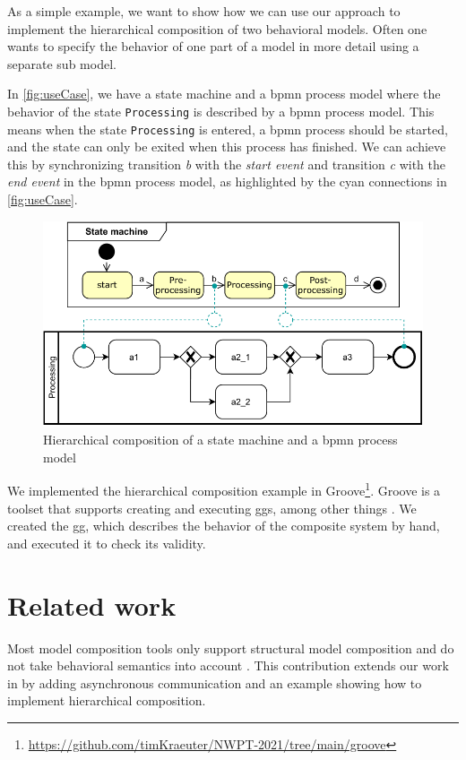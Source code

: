 \documentclass[a4paper]{easychair}
\begin{document}
As a simple example, we want to show how we can use our approach to implement the hierarchical composition of two behavioral models.
Often one wants to specify the behavior of one part of a model in more detail using a separate sub model.

In \autoref{fig:useCase}, we have a state machine and a \gls*{bpmn} process model where the behavior of the state \texttt{Processing} is described by a \gls*{bpmn} process model.
This means when the state \texttt{Processing} is entered, a \gls*{bpmn} process should be started, and the state can only be exited when this process has finished.
We can achieve this by synchronizing transition \textit{b} with the \textit{start event} and transition \textit{c} with the \textit{end event} in the \gls*{bpmn} process model, as highlighted by the cyan connections in \autoref{fig:useCase}.

\begin{figure}[h]
    \centering
    \includegraphics[width=.5\textwidth]{images/usecase.pdf}
    \caption{Hierarchical composition of a state machine and a \gls*{bpmn} process model}
    \label{fig:useCase}
\end{figure}
We implemented the hierarchical composition example in Groove\footnote{\url{https://github.com/timKraeuter/NWPT-2021/tree/main/groove}}. %
Groove is a toolset that supports creating and executing \glspl*{gg}, among other things \cite{ghamarianModellingAnalysisUsing2012, rensinkGROOVESimulatorTool2004}.
We created the \gls*{gg}, which describes the behavior of the composite system by hand, and executed it to check its validity.

\section{Related work}
Most model composition tools only support structural model composition and do not take behavioral semantics into account \cite{kienzleUnifyingFrameworkHomogeneous2019}.
This contribution extends our work in \cite{krauterBehavioralConsistencyHeterogeneous2021} by adding asynchronous communication and an example showing how to implement hierarchical composition.
\end{document}
